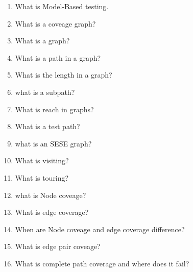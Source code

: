 \documentclass[10pt]{article}
\begin{document}
\begin{enumerate}
    \item What is Model-Based testing.\\

    \item What is a coveage graph?\\

    \item What is a graph?

    \item What is a path in a graph?\\


    \item What is the length in a graph?
          \\

    \item what is a subpath?\\

    \item What is reach in graphs?\\

    \item What is a test path?

    \item what is an SESE graph?\\

    \item What is visiting?
    \item What is touring?\\

    \item what is Node coveage?\\

    \item What is edge coverage?\\

    \item When are Node coveage and edge coverage difference?\\


    \item What is edge pair coveage?\\

    \item What is complete path coverage and where does it fail?\\


\end{enumerate}
\end{document}
